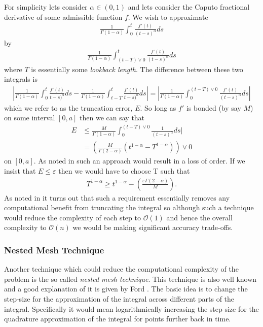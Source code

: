 For simplicity lets consider $ \alpha \in (0, 1) $ and lets consider the Caputo fractional derivative of some admissible function $ f $.
We wish to approximate
\begin{align}
	\frac{1}{\Gamma(1-\alpha)} \int_0^t \frac{f'(t)}{(t-s)^\alpha} ds
\end{align}
by
\begin{align}
	\frac{1}{\Gamma(1-\alpha)} \int_{({t-T})\vee 0}^t \frac{f'(t)}{(t-s)^\alpha} ds
\end{align}
where $ T $ is essentially some \emph{lookback length}.
The difference between these two integrals is 
\begin{align}
	\left| \frac{1}{\Gamma(1-\alpha)} \int_0^t \frac{f'(t)}{t-s)^\alpha} ds - \frac{1}{\Gamma(1-\alpha)} \int_{t-T}^t \frac{f'(t)}{t-s)^\alpha} ds \right| =  \left| \frac{1}{\Gamma(1-\alpha)} \int_{0}^{({t-T})\vee 0} \frac{f'(t)}{(t-s)^\alpha} ds \right|
\end{align}
which we refer to as the truncation error, $E$. So long as $ f' $ is bonded (by say $ M $) on some interval $ [0,a] $ then we can say that 
\begin{align}
	E &\leq \frac{M}{\Gamma(1-\alpha)} \int_0^{({t-T})\vee 0} \frac{1}{(t-s)^\alpha} ds| \\
		&= \left(\frac{M}{\Gamma(2 - \alpha)} (t^{1-\alpha} - T^{1-\alpha})\right)\vee 0
\end{align}
on $ [0,a] $.
As noted in \cite{Ford2001} such an approach would result in a loss of order. If we insist that $ E \leq \varepsilon $ then we would have to choose T such that
\begin{align}
	T^{1-\alpha} \geq t^{1-\alpha} - \left( \frac{\varepsilon \Gamma(2 - \alpha)}{M}\right).
\end{align}
As noted in \cite{Ford2001} it turns out that such a requirement essentially removes any computational benefit from truncating the integral so although such a technique would reduce the complexity of each step to $ \mathcal{O}(1) $ and hence the overall complexity to $ \mathcal{O}(n) $ we would be making significant accuracy trade-offs.

\subsubsection{Nested Mesh Technique}

Another technique which could reduce the computational complexity of the problem is the so called \emph{nested mesh technique}. This technique is also well known and a good explanation of it is given by Ford \cite{Ford2001}. The basic idea is to change the step-size for the approximation of the integral across different parts of the integral. Specifically it would mean logarithmically increasing the step size for the quadrature approximation of the integral for points further back in time. 


\clearpage 
